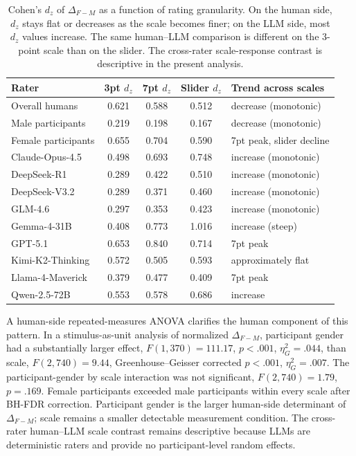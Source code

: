 \documentclass[a4paper,fleqn,review,longmktitle]{cas-sc}
\begin{document}
\begin{table}[t]
  \small
  \centering
  \begin{tabular}{lcccl}
    \toprule
    Rater & 3pt $d_z$ & 7pt $d_z$ & Slider $d_z$ & Trend across scales \\
    \midrule
    Overall humans      & 0.621 & 0.588 & 0.512 & decrease (monotonic) \\
    Male participants   & 0.219 & 0.198 & 0.167 & decrease (monotonic) \\
    Female participants & 0.655 & 0.704 & 0.590 & 7pt peak, slider decline \\
    \midrule
    Claude-Opus-4.5     & 0.498 & 0.693 & 0.748 & increase (monotonic) \\
    DeepSeek-R1         & 0.289 & 0.422 & 0.510 & increase (monotonic) \\
    DeepSeek-V3.2       & 0.289 & 0.371 & 0.460 & increase (monotonic) \\
    GLM-4.6             & 0.297 & 0.353 & 0.423 & increase (monotonic) \\
    Gemma-4-31B         & 0.408 & 0.773 & 1.016 & increase (steep) \\
    GPT-5.1             & 0.653 & 0.840 & 0.714 & 7pt peak \\
    Kimi-K2-Thinking    & 0.572 & 0.505 & 0.593 & approximately flat \\
    Llama-4-Maverick    & 0.379 & 0.477 & 0.409 & 7pt peak \\
    Qwen-2.5-72B        & 0.553 & 0.578 & 0.686 & increase \\
    \bottomrule
  \end{tabular}
  \caption{Cohen's $d_z$ of $\Delta_{F-M}$ as a function of rating granularity. On the human side, $d_z$ stays flat or decreases as the scale becomes finer; on the LLM side, most $d_z$ values increase. The same human--LLM comparison is different on the 3-point scale than on the slider. The cross-rater scale-response contrast is descriptive in the present analysis.}
  \label{tab:scale-response}
\end{table}

A human-side repeated-measures ANOVA clarifies the human component of this pattern. In a stimulus-as-unit analysis of normalized $\Delta_{F-M}$, participant gender had a substantially larger effect, $F(1, 370) = 111.17$, $p < .001$, $\eta^2_G = .044$, than scale, $F(2, 740) = 9.44$, Greenhouse--Geisser corrected $p < .001$, $\eta^2_G = .007$. The participant-gender by scale interaction was not significant, $F(2, 740) = 1.79$, $p = .169$. Female participants exceeded male participants within every scale after BH-FDR correction. Participant gender is the larger human-side determinant of $\Delta_{F-M}$; scale remains a smaller detectable measurement condition. The cross-rater human--LLM scale contrast remains descriptive because LLMs are deterministic raters and provide no participant-level random effects.
\end{document}
